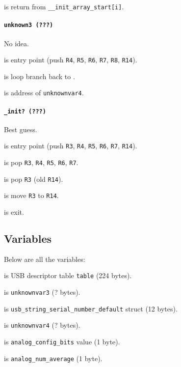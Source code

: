  is return from \texttt{\_\_init\_array\_start[i]}.

\paragraph{\texttt{unknown3 (???)}} No idea.

 is entry point (push \texttt{R4}, \texttt{R5},
\texttt{R6}, \texttt{R7}, \texttt{R8}, \texttt{R14}).

 is loop branch back to .

 is address of \texttt{unknownvar4}.

\paragraph{\texttt{\_init? (???)}} Best guess.

 is entry point (push \texttt{R3}, \texttt{R4},
\texttt{R5}, \texttt{R6}, \texttt{R7}, \texttt{R14}).

 is pop \texttt{R3}, \texttt{R4}, \texttt{R5},
\texttt{R6}, \texttt{R7}.

 is pop \texttt{R3} (old \texttt{R14}).

 is move \texttt{R3} to \texttt{R14}.

 is exit.

\subsection{Variables}

Below are all the variables:

\vspace{1em}

 is USB descriptor table \texttt{table} (224 bytes).

 is \texttt{unknownvar3} (? bytes).

 is {\tiny
\texttt{usb\_string\_serial\_number\_default}} struct (12 bytes).

 is \texttt{unknownvar4} (? bytes).

 is \texttt{analog\_config\_bits} value (1 byte).

 is \texttt{analog\_num\_average} (1 byte).

